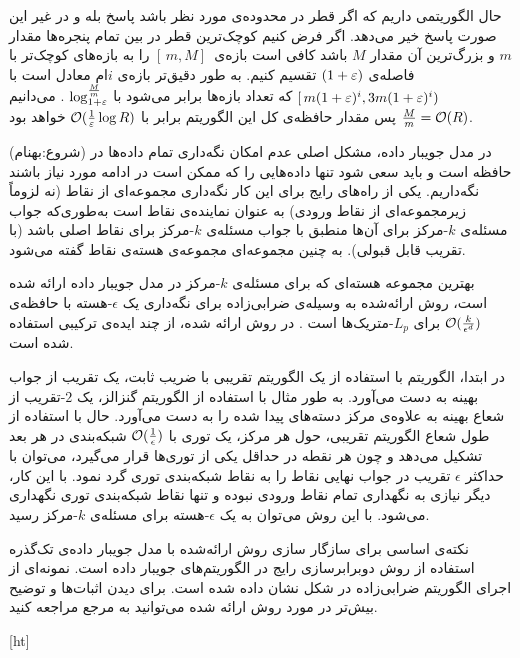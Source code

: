 حال الگوریتمی داریم که اگر قطر در محدوده‌ی مورد نظر باشد پاسخ بله و در غیر این صورت پاسخ خیر می‌دهد. اگر فرض کنیم کوچک‌ترین قطر در بین تمام پنجره‌ها مقدار $m$ و بزرگ‌ترین آن مقدار $M$ باشد کافی است بازه‌ی 
$ [\,m, M]\,$
را به بازه‌های کوچک‌تر با فاصله‌ی $(1+\varepsilon) $ تقسیم کنیم. به طور دقیق‌تر بازه‌ی $i$ام معادل است با
$ [\, m (1+\varepsilon)^i, 3 m (1+ \varepsilon)^i )$
که تعداد بازه‌ها برابر می‌‌شود با 
$ \log_{1+\varepsilon}^{\frac{M}{m}}$
. می‌دانیم
$\frac{M}{m} = \mathcal{O}(R)$
پس مقدار حافظه‌ی کل این الگوریتم برابر با
$\mathcal{O}(\frac{1}{\varepsilon} \log R)$
خواهد بود.


(شروع:بهنام)
در مدل جویبار داده، مشکل اصلی عدم امکان نگه‌داری تمام داده‌ها در حافظه است و باید سعی شود تنها داده‌هایی را که ممکن است در ادامه مورد نیاز باشند نگه‌داریم.
یکی از راه‌های رایج برای این کار نگه‌داری مجموعه‌ای از نقاط (نه لزوماً زیرمجموعه‌ای از نقاط ورودی) به عنوان نماینده‌ی نقاط است به‌طوری‌که جواب مسئله‌ی $k$-مرکز برای آن‌ها منطبق با جواب مسئله‌ی $k$-مرکز برای نقاط اصلی باشد (با تقریب قابل قبولی).
به چنین مجموعه‌ای مجموعه‌ی هسته‌ی نقاط گفته می‌شود. 

بهترین مجموعه هسته‌ای که برای مسئله‌ی $k$-مرکز در مدل جویبار داده ارائه شده است، روش ارائه‌شده به وسیله‌ی ضرابی‌زاده برای نگه‌داری یک $\epsilon$-هسته با حافظه‌ی $\mathcal{O}(\frac{k}{\epsilon^d})$ برای $L_p$-متریک‌ها است .
در روش ارائه شده، از چند ایده‌ی ترکیبی استفاده شده است. 

در ابتدا، الگوریتم با استفاده از یک الگوریتم تقریبی با ضریب ثابت، یک تقریب از جواب بهینه به دست می‌آورد.
به طور مثال با استفاده از الگوریتم گنزالز، یک $2$-تقریب از شعاع بهینه به علاوه‌ی مرکز دسته‌های پیدا شده را به دست می‌آورد.
حال با استفاده از طول شعاع الگوریتم تقریبی، حول هر مرکز، یک توری با $\mathcal{O}(\frac{1}{\epsilon})$ شبکه‌بندی در هر بعد تشکیل می‌دهد و چون هر نقطه در حداقل یکی از توری‌ها قرار می‌گیرد، می‌توان با حداکثر $\epsilon$ تقریب در جواب نهایی نقاط را به نقاط شبکه‌بندی توری گرد نمود.
با این کار، دیگر نیازی به نگهداری تمام نقاط ورودی نبوده و تنها نقاط شبکه‌بندی توری نگهداری می‌شود.
با این روش می‌توان به یک $\epsilon$-هسته برای مسئله‌ی $k$-مرکز رسید. 

نکته‌ی اساسی برای سازگار سازی روش ارائه‌شده با مدل جویبار داده‌ی تک‌گذره استفاده از روش دوبرابرسازی رایج در الگوریتم‌های جویبار داده است.
نمونه‌ای از اجرای الگوریتم ضرابی‌زاده در شکل  نشان داده شده است.
برای دیدن اثبات‌ها و توضیح بیش‌تر در مورد روش ارائه شده می‌توانید به مرجع  مراجعه کنید.

[ht]


